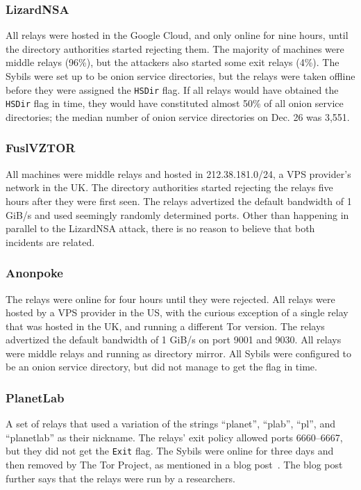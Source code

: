 \subsubsection{LizardNSA}
All relays were hosted in the Google Cloud, and only online for nine hours,
until the directory authorities started rejecting them.  The majority of
machines were middle relays (96\%), but the attackers also started some exit
relays (4\%).  The Sybils were set up to be onion service directories, but the
relays were taken offline before they were assigned the \texttt{HSDir} flag.  If
all relays would have obtained the \texttt{HSDir} flag in time, they would have
constituted almost 50\% of all onion service directories; the median number of
onion service directories on Dec. 26 was 3,551.

\subsubsection{FuslVZTOR}
All machines were middle relays and hosted in 212.38.181.0/24, a VPS provider's
network in the UK.  The directory authorities started rejecting the relays five
hours after they were first seen.  The relays advertized the default bandwidth
of 1 GiB/s and used seemingly randomly determined ports.  Other than happening
in parallel to the LizardNSA attack, there is no reason to believe that both
incidents are related.

\subsubsection{Anonpoke}
The relays were online for four hours until they were rejected.  All relays were
hosted by a VPS provider in the US, with the curious exception of a single relay
that was hosted in the UK, and running a different Tor version.  The relays
advertized the default bandwidth of 1 GiB/s on port 9001 and 9030.  All relays
were middle relays and running as directory mirror.  All Sybils were configured
to be an onion service directory, but did not manage to get the flag in time.

\subsubsection{PlanetLab}
A set of relays that used a variation of the strings ``planet'', ``plab'',
``pl'', and ``planetlab'' as their nickname.  The relays' exit policy allowed
ports 6660--6667, but they did not get the \texttt{Exit} flag.  The Sybils were
online for three days and then removed by The Tor Project, as mentioned in a
blog post~\cite{planetlab}.  The blog post further says that the relays were run
by a researchers.


